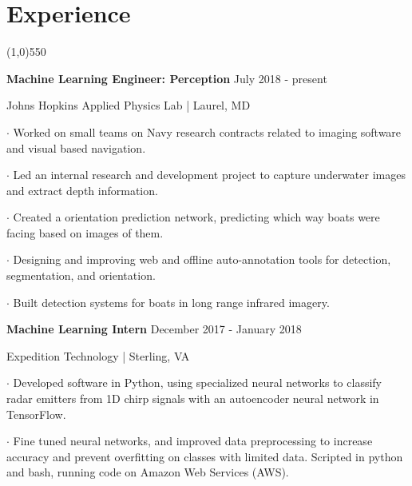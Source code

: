 \documentclass[11pt]{article} %
\begin{document}
	\section*{Experience}
	\vspace{-7ex}
	\begin{center}
    \line(1,0){550}
    \end{center}
    \vspace{-1ex}
    \textbf{\large Machine Learning Engineer: Perception} \hfill July 2018 - present \vspace{-0ex}
	\setlength{\parindent}{-0ex} \par
		Johns Hopkins Applied Physics Lab | Laurel, MD \vspace{+1ex} \par
		$\boldsymbol{\cdot}$ Worked on small teams on Navy research contracts related to imaging software and visual based navigation. \par \vspace{+1ex}
		$\boldsymbol{\cdot}$ Led an internal research and development project to capture underwater images and extract depth information. \par \vspace{+1ex}
		$\boldsymbol{\cdot}$ Created a orientation prediction network, predicting which way boats were facing based on images of them. \par \vspace{+1ex}
		$\boldsymbol{\cdot}$ Designing and improving web and offline auto-annotation tools for detection, segmentation, and orientation.\par \vspace{+1ex}
		$\boldsymbol{\cdot}$ Built detection systems for boats in long range infrared imagery. \par \vspace{+1ex}
    \vspace{1 ex}
    \textbf{\large Machine Learning Intern} \hfill December 2017 - January 2018 \vspace{-0ex}
	\setlength{\parindent}{-0ex} \par
		Expedition Technology | Sterling, VA \vspace{+1ex} \par
		$\boldsymbol{\cdot}$ Developed software in Python, using specialized neural networks to classify radar emitters from 1D chirp signals with an autoencoder neural network in TensorFlow. \par \vspace{+1ex}
		$\boldsymbol{\cdot}$ Fine tuned neural networks, and improved data preprocessing to increase accuracy and prevent overfitting on classes with limited data. Scripted in python and bash, running code on Amazon Web Services (AWS). \par \vspace{+2ex}
\end{document}
